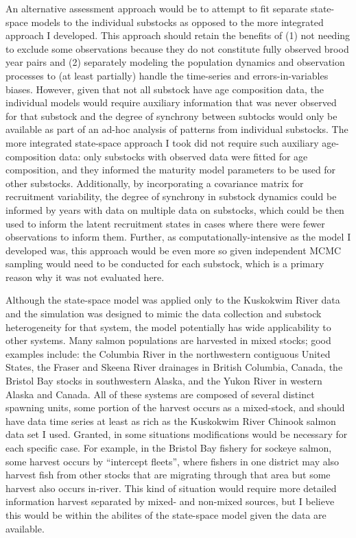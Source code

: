 \documentclass[12pt,]{book}
\theoremstyle{definition}
\theoremstyle{definition}
\theoremstyle{definition}
\theoremstyle{remark}
\begin{document}
An alternative assessment approach would be to attempt to fit separate
state-space models to the individual substocks as opposed to the more
integrated approach I developed. This approach should retain the
benefits of (1) not needing to exclude some observations because they do
not constitute fully observed brood year pairs and (2) separately
modeling the population dynamics and observation processes to (at least
partially) handle the time-series and errors-in-variables biases.
However, given that not all substock have age composition data, the
individual models would require auxiliary information that was never
observed for that substock and the degree of synchrony between subtocks
would only be available as part of an ad-hoc analysis of patterns from
individual substocks. The more integrated state-space approach I took
did not require such auxiliary age-composition data: only substocks with
observed data were fitted for age composition, and they informed the
maturity model parameters to be used for other substocks. Additionally,
by incorporating a covariance matrix for recruitment variability, the
degree of synchrony in substock dynamics could be informed by years with
data on multiple data on substocks, which could be then used to inform
the latent recruitment states in cases where there were fewer
observations to inform them. Further, as computationally-intensive as
the model I developed was, this approach would be even more so given
independent MCMC sampling would need to be conducted for each substock,
which is a primary reason why it was not evaluated here.

Although the state-space model was applied only to the Kuskokwim River
data and the simulation was designed to mimic the data collection and
substock heterogeneity for that system, the model potentially has wide
applicability to other systems. Many salmon populations are harvested in
mixed stocks; good examples include: the Columbia River in the
northwestern contiguous United States, the Fraser and Skeena River
drainages in British Columbia, Canada, the Bristol Bay stocks in
southwestern Alaska, and the Yukon River in western Alaska and Canada.
All of these systems are composed of several distinct spawning units,
some portion of the harvest occurs as a mixed-stock, and should have
data time series at least as rich as the Kuskokwim River Chinook salmon
data set I used. Granted, in some situations modifications would be
necessary for each specific case. For example, in the Bristol Bay
fishery for sockeye salmon, some harvest occurs by ``intercept fleets'',
where fishers in one district may also harvest fish from other stocks
that are migrating through that area but some harvest also occurs
in-river. This kind of situation would require more detailed information
harvest separated by mixed- and non-mixed sources, but I believe this
would be within the abilites of the state-space model given the data are
available.
\end{document}
